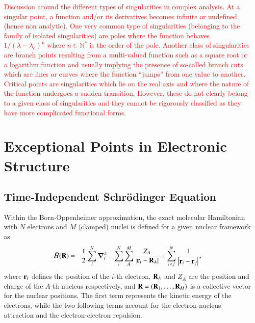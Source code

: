 \documentclass[aps,prb,reprint,noshowkeys,superscriptaddress]{revtex4-1}
\newcommand{\titou}[1]{\textcolor{red}{#1}}
\newcommand{\Ne}{N} %
\newcommand{\Nn}{M} %
\newcommand{\hH}{\Hat{H}}
\begin{document}
\titou{Discussion around the different types of singularities in complex analysis.
At a singular point, a function and/or its derivatives becomes infinite or undefined (hence non analytic).
One very common type of singularities (belonging to the family of isolated singularities) are poles where the function behaves $1/(\lambda - \lambda_c)^n$ where $n \in \mathbb{N}^*$ is the order of the pole.
Another class of singularities are branch points resulting from a multi-valued function such as a square root or a logarithm function and usually implying the presence of so-called branch cuts which are lines or curves where the function ``jumps'' from one value to another.
Critical points are singularities which lie on the real axis and where the nature of the function undergoes a sudden transition. 
However, these do not clearly belong to a given class of singularities and they cannot be rigorously classified as they have more complicated functional forms.
}

\section{Exceptional Points in Electronic Structure}
\label{sec:EPs}

\subsection{Time-Independent Schr\"odinger Equation}
\label{sec:TDSE}
Within the Born-Oppenheimer approximation, the exact molecular Hamiltonian with $\Ne$ electrons and 
$\Nn$ (clamped) nuclei is defined for a given nuclear framework as
\begin{equation}\label{eq:ExactHamiltonian}
    \hH(\vb{R}) = 
    - \frac{1}{2} \sum_{i}^{\Ne} \grad_i^2 
    - \sum_{i}^{\Ne} \sum_{A}^{\Nn} \frac{Z_A}{\abs{\vb{r}_i-\vb{R}_A}} 
    + \sum_{i<j}^{\Ne}\frac{1}{\abs{\vb{r}_i-\vb{r}_j}},
\end{equation}
where $\vb{r}_i$ defines the position of the $i$-th electron, $\vb{R}_{A}$ and $Z_{A}$ are the position
and charge of the $A$-th nucleus respectively, and $\vb{R} = (\vb{R}_{1}, \dots, \vb{R}_{\Nn})$ is a
collective vector for the nuclear positions.
The first term represents the kinetic energy of the electrons, while 
the two following terms account for the electron-nucleus attraction and the electron-electron repulsion.
\end{document}
